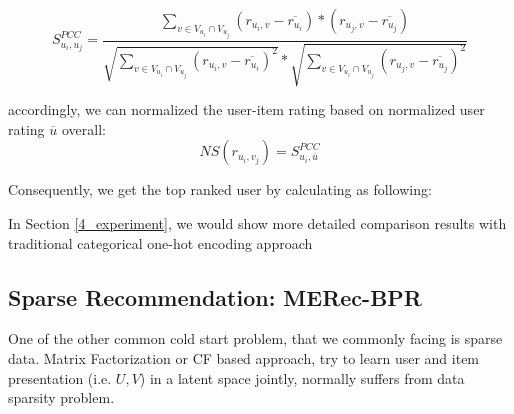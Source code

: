     \begin{equation}\label{pcc}
        S_{u_i,u_j}^{PCC} = 
        \dfrac{
            \sum_{v \in V_{u_i} \cap V_{u_j}} (r_{u_i,v}-\overline{r_{u_i}}) 
            * 
            (r_{u_j,v} - \overline{r_{u_j}})
        }
        {
            \sqrt{\sum_{v \in V_{u_i} \cap V_{u_j}} (r_{u_i,v}-\overline{r_{u_i}})^2} 
            * 
            \sqrt{\sum_{v \in V_{u_i} \cap V_{u_j}} (r_{u_j,v}-\overline{r_{u_j}})^2}
        }
    \end{equation}

accordingly, we can normalized the user-item rating based on normalized user rating $\overline{u}$ overall:
\begin{equation}\label{pcc}
    NS(r_{u_i,v_j}) =  S_{u_i,\overline{u}}^{PCC}
\end{equation}

Consequently, we get the top ranked user by calculating as following:


In Section \ref{4_experiment}, we would show more detailed comparison results with traditional categorical one-hot encoding approach

\subsection{Sparse Recommendation: MERec-BPR}\label{3BPR}
One of the other common cold start problem, that we commonly facing is sparse data. Matrix Factorization or CF based approach, try to learn user and item presentation (i.e. $U, V$) in a latent space jointly, normally suffers from data sparsity problem.


